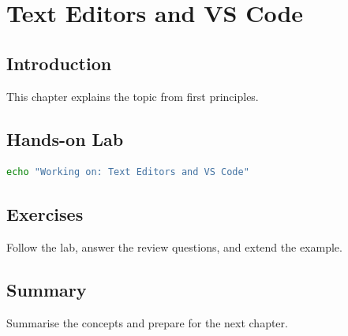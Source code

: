 \chapter{Text Editors and VS Code}
\label{chap:vol2-12}



\section{Introduction}
This chapter explains the topic from first principles.

\section{Hands-on Lab}
\begin{lstlisting}[language=bash]
echo "Working on: Text Editors and VS Code"
\end{lstlisting}

\section{Exercises}
\begin{exercise}
Follow the lab, answer the review questions, and extend the example.
\end{exercise}

\section{Summary}
Summarise the concepts and prepare for the next chapter.

